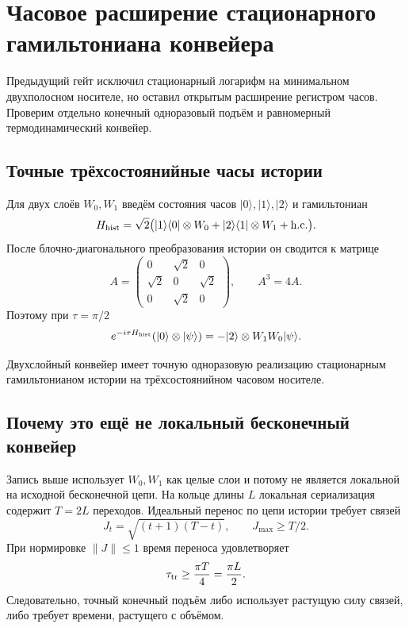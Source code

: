 \chapter{Часовое расширение стационарного гамильтониана конвейера}
\label{ch:v8-clock-augmented-static-hamiltonian-conveyor-gate}

Предыдущий гейт исключил стационарный логарифм на минимальном двухполосном
носителе, но оставил открытым расширение регистром часов. Проверим отдельно
конечный одноразовый подъём и равномерный термодинамический конвейер.

\section{Точные трёхсостоянийные часы истории}

Для двух слоёв $W_0,W_1$ введём состояния часов $|0\rangle,|1\rangle,|2\rangle$
и гамильтониан
\begin{equation}
 H_{\rm hist}=\sqrt2\bigl(
 |1\rangle\langle0|\otimes W_0+|2\rangle\langle1|\otimes W_1+\mathrm{h.c.}
 \bigr).
\end{equation}
После блочно-диагонального преобразования истории он сводится к матрице
\begin{equation}
 A=\begin{pmatrix}0&\sqrt2&0\\ \sqrt2&0&\sqrt2\\0&\sqrt2&0\end{pmatrix},
 \qquad A^3=4A.
\end{equation}
Поэтому при $\tau=\pi/2$
\begin{equation}
 e^{-i\tau H_{\rm hist}}
 (|0\rangle\otimes|\psi\rangle)
 =-|2\rangle\otimes W_1W_0|\psi\rangle.
\end{equation}

\begin{theorem}
Двухслойный конвейер имеет точную одноразовую реализацию стационарным
гамильтонианом истории на трёхсостоянийном часовом носителе.
\end{theorem}

\section{Почему это ещё не локальный бесконечный конвейер}

Запись выше использует $W_0,W_1$ как целые слои и потому не является
локальной на исходной бесконечной цепи. На кольце длины $L$ локальная
сериализация содержит $T=2L$ переходов. Идеальный перенос по цепи истории
требует связей
\begin{equation}
 J_t=\sqrt{(t+1)(T-t)},\qquad J_{\max}\geq T/2.
\end{equation}
При нормировке $\|J\|\leq1$ время переноса удовлетворяет
\begin{equation}
 \tau_{\rm tr}\geq\frac{\pi T}{4}=\frac{\pi L}{2}.
\end{equation}
Следовательно, точный конечный подъём либо использует растущую силу связей,
либо требует времени, растущего с объёмом.

